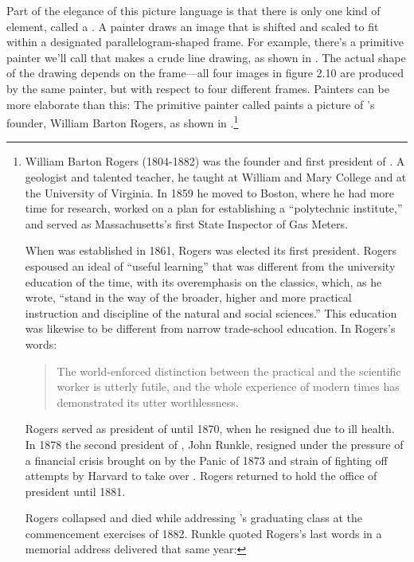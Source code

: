 Part of the elegance of this picture language is that there is only one kind of
element, called a .  A painter draws an image that is shifted
and scaled to fit within a designated parallelogram-shaped frame.  For example,
there's a primitive painter we'll call  that makes a crude line
drawing, as shown in .  The actual shape of the drawing
depends on the frame---all four images in figure 2.10 are produced by the
same  painter, but with respect to four different frames.  Painters
can be more elaborate than this: The primitive painter called 
paints a picture of 's founder, William Barton Rogers, as shown in
.\footnote{William Barton Rogers (1804-1882) was the founder
and first president of .  A geologist and talented teacher, he
taught at William and Mary College and at the University of Virginia.  In 1859
he moved to Boston, where he had more time for research, worked on a plan for
establishing a ``polytechnic institute,'' and served as Massachusetts's first
State Inspector of Gas Meters.

When  was established in 1861, Rogers was elected its first
president.  Rogers espoused an ideal of ``useful learning'' that was different
from the university education of the time, with its overemphasis on the
classics, which, as he wrote, ``stand in the way of the broader, higher and
more practical instruction and discipline of the natural and social sciences.''
This education was likewise to be different from narrow trade-school education.
In Rogers's words:

\begin{quote}
The world-enforced distinction between the practical and the scientific worker
is utterly futile, and the whole experience of modern times has demonstrated
its utter worthlessness.
\end{quote}

Rogers served as president of  until 1870, when he resigned due to
ill health.  In 1878 the second president of , John Runkle,
resigned under the pressure of a financial crisis brought on by the Panic of
1873 and strain of fighting off attempts by Harvard to take over .
Rogers returned to hold the office of president until 1881.

Rogers collapsed and died while addressing 's graduating class at
the commencement exercises of 1882.  Runkle quoted Rogers's last words in a
memorial address delivered that same year:

}
